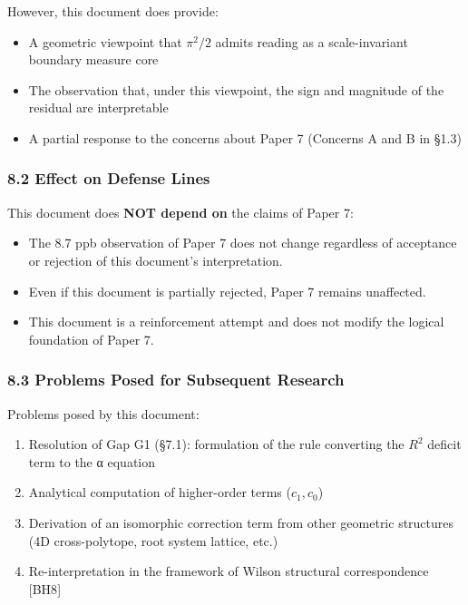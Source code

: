 \documentclass[
]{article}
\providecommand{\tightlist}{%
  \setlength{\itemsep}{0pt}\setlength{\parskip}{0pt}}
\begin{document}
However, this document does provide:

\begin{itemize}
\tightlist
\item
  A geometric viewpoint that \(\pi^2/2\) admits reading as a
  scale-invariant boundary measure core
\item
  The observation that, under this viewpoint, the sign and magnitude of
  the residual are interpretable
\item
  A partial response to the concerns about Paper 7 (Concerns A and B in
  §1.3)
\end{itemize}

\subsubsection{8.2 Effect on Defense
Lines}\label{effect-on-defense-lines}

This document does \textbf{NOT depend on} the claims of Paper 7:

\begin{itemize}
\tightlist
\item
  The 8.7 ppb observation of Paper 7 does not change regardless of
  acceptance or rejection of this document's interpretation.
\item
  Even if this document is partially rejected, Paper 7 remains
  unaffected.
\item
  This document is a reinforcement attempt and does not modify the
  logical foundation of Paper 7.
\end{itemize}

\subsubsection{8.3 Problems Posed for Subsequent
Research}\label{problems-posed-for-subsequent-research}

Problems posed by this document:

\begin{enumerate}
\def\labelenumi{\arabic{enumi}.}
\tightlist
\item
  Resolution of Gap G1 (§7.1): formulation of the rule converting the
  \(R^2\) deficit term to the α equation
\item
  Analytical computation of higher-order terms (\(c_1, c_0\))
\item
  Derivation of an isomorphic correction term from other geometric
  structures (4D cross-polytope, root system lattice, etc.)
\item
  Re-interpretation in the framework of Wilson structural correspondence
  {[}BH8{]}
\end{enumerate}
\end{document}
